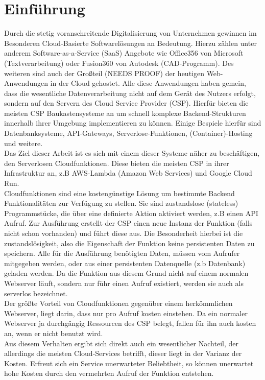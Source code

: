 \documentclass[12pt,a4paper,parskip=half]{scrreprt}
\begin{document}
\chapter{Einführung}
Durch die stetig voranschreitende Digitalisierung von Unternehmen gewinnen im Besonderen Cloud-Basierte Softwarelösungen an Bedeutung. Hierzu zählen unter anderem Software-as-a-Service (SaaS) Angebote wie Office356 von Microsoft (Textverarbeitung) oder Fusion360 von Autodesk (CAD-Programm). Des weiteren sind auch der Großteil (NEEDS PROOF) der heutigen Web-Anwendungen in der Cloud gehostet.  Alle diese Anwendungen haben gemein, dass die wesentliche Datenverarbeitung nicht auf dem Gerät des Nutzers erfolgt, sondern auf den Servern des Cloud Service Provider (CSP). Hierfür bieten die meisten CSP Baukastensysteme an um schnell komplexe Backend-Strukturen innerhalb ihrer Umgebung implementieren zu können. Einige Bespiele hierfür sind Datenbanksysteme, API-Gateways, Serverlose-Funktionen, (Container)-Hosting und weitere.
\\
Das Ziel dieser Arbeit ist es sich mit einem dieser Systeme näher zu beschäftigen, den Serverlosen Cloudfunktionen. Diese bieten die meisten CSP in ihrer Infrastruktur an, z.B AWS-Lambda (Amazon Web Services) und Google Cloud Run.
\\
Cloudfunktionen sind eine kostengünstige Lösung um bestimmte Backend Funktionalitäten zur Verfügung zu stellen. Sie sind zustandslose (stateless) Programmstücke, die über eine definierte Aktion aktiviert werden, z.B einen API Aufruf. Zur Ausführung erstellt der CSP einen neue Instanz der Funktion (falls nicht schon vorhanden) und führt diese aus. Die Besonderheit hierbei ist die zustandslösigkeit, also die Eigenschaft der Funktion keine persistenten Daten zu speichern. Alle für die Ausführung benötigten Daten, müssen vom Aufrufer mitgegeben werden, oder aus einer persistenten Datenquelle (z.b Datenbank) geladen werden. Da die Funktion aus diesem Grund nicht auf einem normalen Webserver läuft, sondern nur führ einen Aufruf existiert, werden sie auch als serverlos bezeichnet.
\\
Der größte Vorteil von Cloudfunktionen gegenüber einem herkömmlichen Webserver, liegt darin, dass nur pro Aufruf kosten einstehen. Da ein normaler Webserver ja durchgängig Ressourcen des CSP belegt, fallen für ihn auch kosten an, wenn er nicht benutzt wird.
\\
Aus diesem Verhalten ergibt sich direkt auch ein wesentlicher Nachteil, der allerdings die meisten Cloud-Services betrifft, dieser liegt in der Varianz der Kosten. Erfreut sich ein Service unerwarteter Beliebtheit, so können unerwartet hohe Kosten durch den vermehrten Aufruf der Funktion entstehen.
\end{document}

